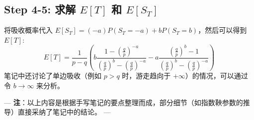\documentclass[12pt, a4paper, oneside, fontset=windows]{ctexbook}
\begin{document}
\subsection{Step 4-5: 求解 $E[T]$ 和 $E[S_T]$}
将吸收概率代入 $E[S_T] = (-a)P(S_T=-a) + b P(S_T=b)$，然后可以得到 $E[T]$:
\[ E[T] = \frac{1}{p-q} \left( b \frac{1 - (\frac{q}{p})^{-a}}{(\frac{q}{p})^b - (\frac{q}{p})^{-a}} - a \frac{(\frac{q}{p})^b - 1}{(\frac{q}{p})^b - (\frac{q}{p})^{-a}} \right) \]
笔记中还讨论了单边吸收（例如 $p>q$ 时，游走趋向于 $+\infty$）的情况，可以通过令 $b \to \infty$ 来分析。

\vspace{2em}
\noindent
---
\textbf{注}：以上内容是根据手写笔记的要点整理而成，部分细节（如指数鞅参数的推导）直接采纳了笔记中的结论。
---
\vspace{1em}
\end{document}

